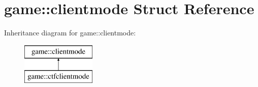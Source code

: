 \hypertarget{structgame_1_1clientmode}{}\section{game\+:\+:clientmode Struct Reference}
\label{structgame_1_1clientmode}
Inheritance diagram for game\+:\+:clientmode\+:\begin{figure}[H]
\begin{center}
\leavevmode
\includegraphics[height=2.000000cm]{structgame_1_1clientmode}
\end{center}
\end{figure}
